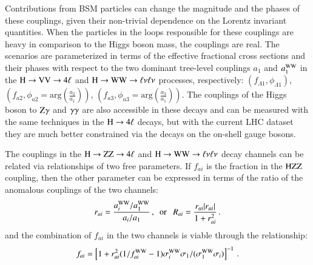 Contributions from BSM particles can change the magnitude and the
phases of these couplings, given their non-trivial dependence on the
Lorentz invariant quantities. When the particles in the loops
responsible for these couplings are heavy in comparison to the Higgs
boson mass, the couplings are real.  The scenarios are parameterized
in terms of the effective fractional cross sections and their phases
with respect to the two dominant tree-level couplings $a_1$ and
$a_1^{\mathrm{W}\mathrm{W}}$ in the $\mathrm{H}\to \mathrm{V}\mathrm{V}\to 4\ell$ and $\mathrm{H}\to \mathrm{W}\mathrm{W}\to
\ell\nu\ell\nu$ processes, respectively:
$(f_{\Lambda1},\phi_{\Lambda1})$, $(f_{a2}, \phi_{a2} =
\mathrm{arg}\left(\frac{a_{2}}{a_{1}}\right))$, $(f_{a3},\phi_{a3} =
\mathrm{arg}\left(\frac{a_{3}}{a_{1}}\right))$.
The couplings of the Higgs boson to $\mathrm{Z}\gamma$ and $\gamma\gamma$ are also
accessible in these decays and can be measured with the same techniques in
the $\mathrm{H}\to4\ell$ decays, but with the current LHC dataset they are much better 
constrained via the decays on the on-shell gauge bosons.

The couplings in the $\mathrm{H}\to\mathrm{Z}\mathrm{Z}\to4\ell$ and $\mathrm{H}\to\mathrm{W}\mathrm{W}\to\ell\nu\ell\nu$ decay channels can be related via 
relationships of two free parameters. If $f_{ai}$ is the fraction in the $\mathrm{H}\mathrm{Z}\mathrm{Z}$ coupling, then
the other parameter can be expressed in terms of the ratio of the anomalous couplings of the two channels:
%
\begin{eqnarray}
r_{ai} = \frac{a_i^{\mathrm{W}\mathrm{W}} / a_1^{\mathrm{W}\mathrm{W}}  }{  a_i / a_1}\,, ~~{\rm or}~~~ R_{ai} = \frac{ r_{ai} |r_{ai}| }{  1 + r_{ai}^2 }  \, .
\label{eq:ratio_ww_zz}
\end{eqnarray} 
%
and the combination of $f_{ai}$ in the two channels is viable through the relationship:
%
\begin{eqnarray}
f_{ai} = \left[ 1+r_{ai}^2(1/f_{ai}^{\mathrm{W}\mathrm{W}}-1)\sigma_{i}^{\mathrm{W}\mathrm{W}}\sigma_{1}/(\sigma_{1}^{\mathrm{W}\mathrm{W}}\sigma_{i}) \right]^{-1}
\,.
\label{eq:a2_conversion}
\end{eqnarray}
%


